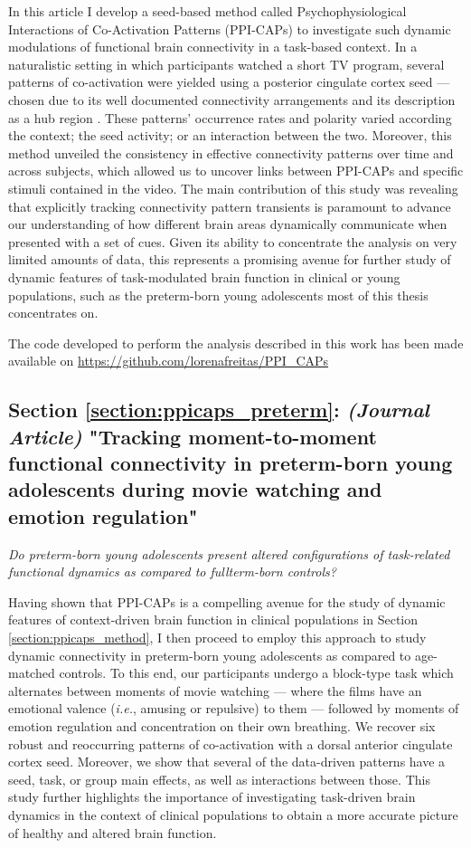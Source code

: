 In this article I develop a seed-based method called Psychophysiological Interactions of Co-Activation Patterns (PPI-CAPs) to investigate such dynamic modulations of functional brain connectivity in a task-based context. In a naturalistic setting in which participants watched a short TV program, several patterns of co-activation were yielded using a posterior cingulate cortex seed --- chosen due to its well documented connectivity arrangements \citep{Liu2013, Karahanoglu2015a,Lin2017} and its description as a hub region \citep{Andrews-hanna2010}. These patterns' occurrence rates and polarity varied according the context; the seed activity; or an interaction between the two. Moreover, this method unveiled the consistency in effective connectivity patterns over time and across subjects, which allowed us to uncover links between PPI-CAPs and specific stimuli contained in the video. The main contribution of this study was revealing that explicitly tracking connectivity pattern transients is paramount to advance our understanding of how different brain areas dynamically communicate when presented with a set of cues. Given its ability to concentrate the analysis on very limited amounts of data, this represents a promising avenue for further study of dynamic features of task-modulated brain function in clinical or young populations, such as the preterm-born young adolescents most of this thesis concentrates on. 

The code developed to perform the analysis described in this work has been made available on \url{https://github.com/lorenafreitas/PPI_CAPs}


\subsection*{Section \ref{section:ppicaps_preterm}: \textit{(Journal Article)} "Tracking moment-to-moment functional connectivity in preterm-born young adolescents during movie watching and emotion regulation"}
\textit{Do preterm-born young adolescents present altered configurations of task-related functional dynamics as compared to fullterm-born controls?}

Having shown that PPI-CAPs is a compelling avenue for the study of dynamic features of context-driven brain function in clinical populations \citep{Freitas2020} in Section \ref{section:ppicaps_method}, I then proceed to employ this approach to study dynamic connectivity in preterm-born young adolescents as compared to age-matched controls. To this end, our participants undergo a block-type task which alternates between moments of movie watching --- where the films have an emotional valence (\textit{i.e.}, amusing or repulsive) to them ---  followed by moments of emotion regulation and concentration on their own breathing. We recover six robust and reoccurring patterns of co-activation with a dorsal anterior cingulate cortex seed. Moreover, we show that several of the data-driven patterns have a seed, task, or group main effects, as well as interactions between those. This study further highlights the importance of investigating task-driven brain dynamics in the context of clinical populations to obtain a more accurate picture of healthy and altered brain function.